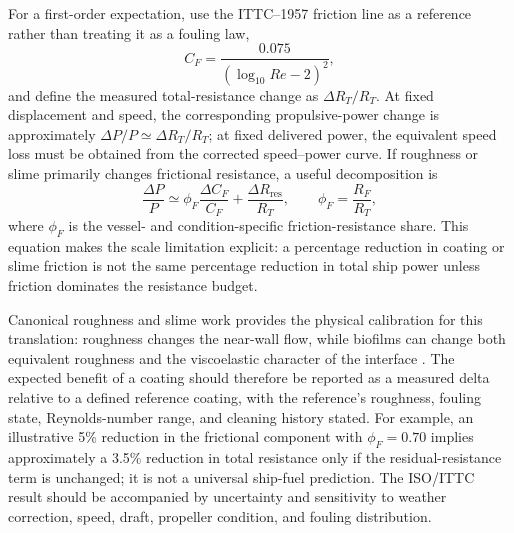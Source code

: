 For a first-order expectation, use the ITTC--1957 friction line as a reference rather than treating it as a fouling law,
\begin{equation}
C_F = \frac{0.075}{(\log_{10}Re-2)^2},
\end{equation}
and define the measured total-resistance change as $\Delta R_T/R_T$. At fixed displacement and speed, the corresponding propulsive-power change is approximately $\Delta P/P \simeq \Delta R_T/R_T$; at fixed delivered power, the equivalent speed loss must be obtained from the corrected speed--power curve. If roughness or slime primarily changes frictional resistance, a useful decomposition is
\begin{equation}
\frac{\Delta P}{P} \simeq \phi_F\frac{\Delta C_F}{C_F}+\frac{\Delta R_{\mathrm{res}}}{R_T}, \qquad \phi_F=\frac{R_F}{R_T},
\end{equation}
where $\phi_F$ is the vessel- and condition-specific friction-resistance share. This equation makes the scale limitation explicit: a percentage reduction in coating or slime friction is not the same percentage reduction in total ship power unless friction dominates the resistance budget.

Canonical roughness and slime work provides the physical calibration for this translation: roughness changes the near-wall flow, while biofilms can change both equivalent roughness and the viscoelastic character of the interface \cite{schultz2007roughness,hunsucker_biofilm_2018,snowdon_surface_2023}. The expected benefit of a coating should therefore be reported as a measured delta relative to a defined reference coating, with the reference's roughness, fouling state, Reynolds-number range, and cleaning history stated. For example, an illustrative 5\% reduction in the frictional component with $\phi_F=0.70$ implies approximately a 3.5\% reduction in total resistance only if the residual-resistance term is unchanged; it is not a universal ship-fuel prediction. The ISO/ITTC result should be accompanied by uncertainty and sensitivity to weather correction, speed, draft, propeller condition, and fouling distribution.

